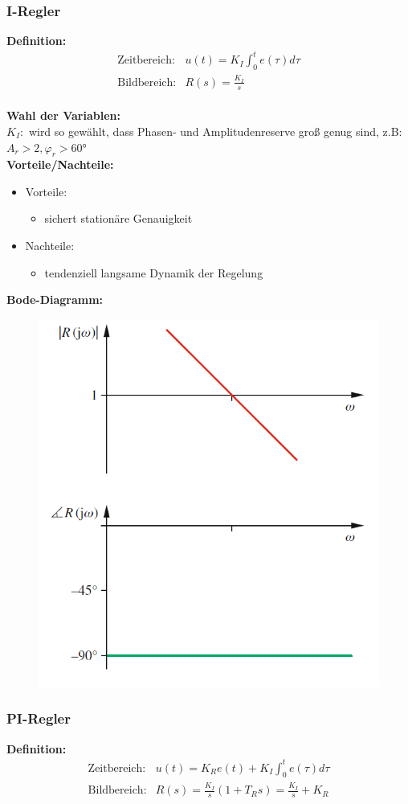 \documentclass[10pt,a4paper]{article}
\begin{document}
\subsubsection{I-Regler}
\textbf{Definition:}
$$
	\begin{array}{ll}
	\text{Zeitbereich:} & u(t) = K_I \int_0^t e(\tau) d\tau \\
	\text{Bildbereich:} & R(s) = \frac{K_I}{s}
	\end{array}
$$ \\

\textbf{Wahl der Variablen:} \\
$K_I:$ wird so gewählt, dass Phasen- und Amplitudenreserve groß genug sind, z.B: $A_r > 2, \varphi_r > 60°$ \\

\textbf{Vorteile/Nachteile:}
\begin{itemize}
	\item Vorteile:
	\begin{itemize}
		\item sichert stationäre Genauigkeit
	\end{itemize}
	\item Nachteile:
	\begin{itemize}
		\item tendenziell langsame Dynamik der Regelung
	\end{itemize}
\end{itemize}

\textbf{Bode-Diagramm:}
\begin{figure}[H]
	\includegraphics[width = 0.4\columnwidth]{imgs/i-regler.png}
\end{figure}

\subsubsection{PI-Regler}
\textbf{Definition:}
$$
	\begin{array}{ll}
	\text{Zeitbereich:} & u(t) = K_R e(t) + K_I \int_0^t e(\tau) d\tau \\
	\text{Bildbereich:} & R(s) = \frac{K_I}{s} (1 + T_R s) = \frac{K_I}{s} + K_R
	\end{array}
$$ \\
\end{document}

